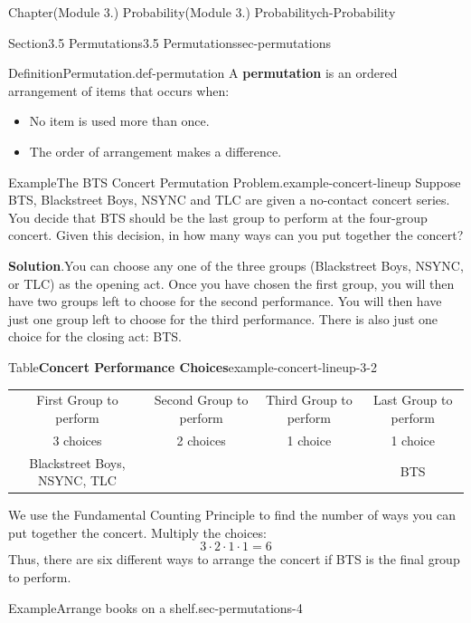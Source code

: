 \documentclass[oneside,10pt,]{book}
\newcommand{\blocktitlefont}{\relax}
\newcommand{\tabularfont}{\relax}
\newcommand{\ptxlistdisc}{\raisebox{0.3ex}{\textbullet}}
\newcommand{\terminology}[1]{\textbf{#1}}
\newcommand{\hrulethin}  {\noalign{\hrule height 0.04em}}
\begin{document}
\begin{chapterptx}{Chapter}{(Module 3.) Probability}{}{(Module 3.) Probability}{}{}{ch-Probability}
%
\begin{sectionptx}{Section}{3.5 Permutations}{}{3.5 Permutations}{}{}{sec-permutations}
\begin{definition}{Definition}{Permutation.}{def-permutation}%
A \terminology{permutation} is an ordered arrangement of items that occurs when:%
\begin{itemize}[label=\ptxlistdisc]
\item{}No item is used more than once.%
\item{}The order of arrangement makes a difference.%
\end{itemize}
%
\end{definition}
\begin{example}{Example}{The BTS Concert Permutation Problem.}{example-concert-lineup}%
Suppose BTS, Blackstreet Boys, NSYNC and TLC are given a no-contact concert series. You decide that BTS should be the last group to perform at the four-group concert. Given this decision, in how many ways can you put together the concert?%
\par\smallskip%
\noindent\textbf{\blocktitlefont Solution}.\hypertarget{example-concert-lineup-3}{}\quad{}You can choose any one of the three groups (Blackstreet Boys, NSYNC, or TLC) as the opening act. Once you have chosen the first group, you will then have two groups left to choose for the second performance. You will then have just one group left to choose for the third performance. There is also just one choice for the closing act: BTS.%
\begin{tableptx}{Table}{\textbf{Concert Performance Choices}}{example-concert-lineup-3-2}{}%
\centering%
{\tabularfont%
\begin{tabular}{cccc}
First Group to perform&Second Group to perform&Third Group to perform&Last Group to perform\tabularnewline\hrulethin
3 choices&2 choices&1 choice&1 choice\tabularnewline[0pt]
Blackstreet Boys, NSYNC, TLC&&&BTS
\end{tabular}
}%
\end{tableptx}%
We use the Fundamental Counting Principle to find the number of ways you can put together the concert. Multiply the choices:%
\begin{equation*}
3 \cdot 2 \cdot 1 \cdot 1 = 6
\end{equation*}
Thus, there are six different ways to arrange the concert if BTS is the final group to perform.%
\end{example}
\begin{example}{Example}{Arrange books on a shelf.}{sec-permutations-4}%

\end{example}
\end{sectionptx}
\end{chapterptx}
\end{document}
